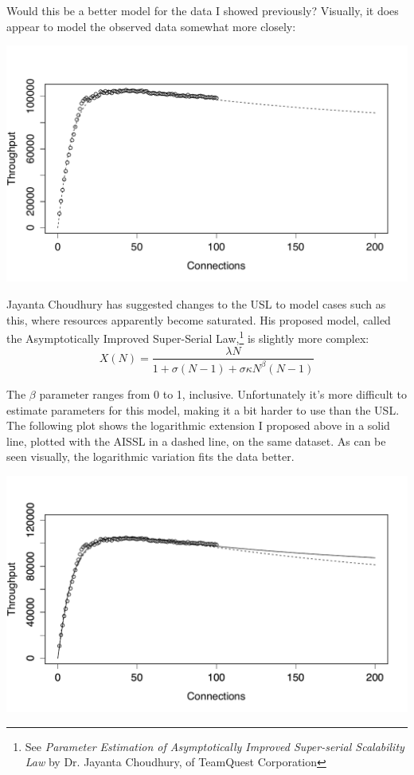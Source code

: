 \documentclass{vivid_layout}
\begin{document}
Would this be a better model for the data I showed previously? Visually, it does
appear to model the observed data somewhat more closely:
\begin{center}
\includegraphics[width=.85\linewidth]{scalability/logscale-2}
\end{center}

Jayanta Choudhury has suggested changes to the USL to model cases such as this,
where resources apparently become saturated.  His proposed model, called the
Asymptotically Improved Super-Serial Law,\footnote{See {\itshape Parameter
Estimation of Asymptotically Improved Super-serial Scalability Law} by Dr.
Jayanta Choudhury, of TeamQuest Corporation} is slightly more complex:
\[
X(N) = \frac{\lambda N}{1 + \sigma(N-1) + \sigma \kappa N^\beta (N-1)}
\]

The $\beta$ parameter ranges from 0 to 1, inclusive. Unfortunately it's
more difficult to estimate parameters for this model, making it a bit harder to
use than the USL. The following plot shows the logarithmic extension I proposed
above in a solid line, plotted with the AISSL in a dashed line, on the same
dataset. As can be seen visually, the logarithmic variation fits the data
better.
\begin{center}
\includegraphics[width=.85\linewidth]{scalability/aissl}
\end{center}
\end{document}
